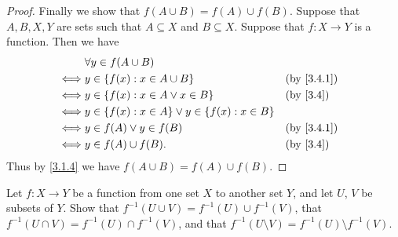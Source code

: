 \begin{proof}
  Finally we show that \(f(A \cup B) = f(A) \cup f(B)\).
  Suppose that \(A, B, X, Y\) are sets such that \(A \subseteq X\) and \(B \subseteq X\).
  Suppose that \(f : X \to Y\) is a function.
  Then we have
  \begin{align*}
         & \forall y \in f(A \cup B)                                                          \\
    \iff & y \in \{f(x) : x \in A \cup B\}                        &  & \by{3.4.1}             \\
    \iff & y \in \{f(x) : x \in A \lor x \in B\}                  &  & \text{(by \cref{3.4})} \\
    \iff & y \in \{f(x) : x \in A\} \lor y \in \{f(x) : x \in B\}                             \\
    \iff & y \in f(A) \lor y \in f(B)                             &  & \by{3.4.1}             \\
    \iff & y \in f(A) \cup f(B).                                  &  & \text{(by \cref{3.4})}
  \end{align*}
  Thus by \cref{3.1.4} we have \(f(A \cup B) = f(A) \cup f(B)\).
\end{proof}

\begin{ex}\label{ex:3.4.4}
  Let \(f : X \to Y\) be a function from one set \(X\) to another set \(Y\), and let \(U\), \(V\) be subsets of \(Y\). Show that \(f^{-1}(U \cup V) = f^{-1}(U) \cup f^{-1}(V)\), that
  \(f^{-1}(U \cap V) = f^{-1}(U) \cap f^{-1}(V)\), and that \(f^{-1}(U \setminus V) = f^{-1}(U) \setminus f^{-1}(V)\).
\end{ex}

